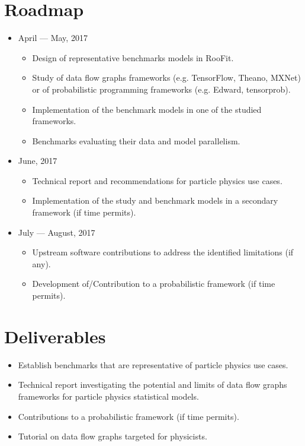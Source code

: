 \section{Roadmap}
\begin{itemize}
	\item April --- May, 2017
	      \begin{itemize}
	      	\item Design of representative benchmarks models in RooFit.
	      	\item Study of data flow graphs frameworks (e.g. TensorFlow, Theano, MXNet) or of probabilistic programming frameworks (e.g. Edward, tensorprob).
	      	\item Implementation of the benchmark models in one of the studied frameworks.
	      	\item Benchmarks evaluating their data and model parallelism.
	      \end{itemize}
	\item June, 2017
	      \begin{itemize}
	      	\item Technical report and recommendations for particle physics use cases.
	      	\item Implementation of the study and benchmark models in a secondary framework (if time permits).
	      \end{itemize}
	\item July --- August, 2017
	      \begin{itemize}
	      	\item Upstream software contributions to address the identified limitations (if any).
	      	\item Development of/Contribution to a probabilistic framework (if time permits).
	      \end{itemize}
\end{itemize}

\section{Deliverables}

\begin{itemize}
	\item Establish benchmarks that are representative of particle physics use cases.
	\item Technical report investigating the potential and limits of data flow graphs frameworks for particle physics statistical models.
	\item Contributions to a probabilistic framework (if time permits).
	\item Tutorial on data flow graphs targeted for physicists.
\end{itemize}
